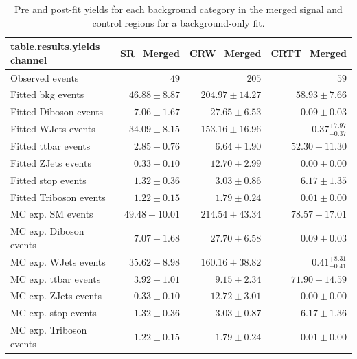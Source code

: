 \begin{table}[t]
\centering
\small
\begin{tabular*}{\textwidth}{@{\extracolsep{\fill}}lrrr}
\toprule
\textbf{table.results.yields channel}           & SR\_Merged            & CRW\_Merged            & CRTT\_Merged              \\
\midrule
Observed events          & $49$              & $205$              & $59$                    \\
\midrule
Fitted bkg events         & $46.88 \pm 8.87$          & $204.97 \pm 14.27$          & $58.93 \pm 7.66$              \\
\midrule
        Fitted Diboson events         & $7.06 \pm 1.67$          & $27.65 \pm 6.53$          & $0.09 \pm 0.03$              \\
        Fitted WJets events         & $34.09 \pm 8.15$          & $153.16 \pm 16.96$          & $0.37_{-0.37}^{+7.97}$              \\
        Fitted ttbar events         & $2.85 \pm 0.76$          & $6.64 \pm 1.90$          & $52.30 \pm 11.30$              \\
        Fitted ZJets events         & $0.33 \pm 0.10$          & $12.70 \pm 2.99$          & $0.00 \pm 0.00$              \\
        Fitted stop events         & $1.32 \pm 0.36$          & $3.03 \pm 0.86$          & $6.17 \pm 1.35$              \\
        Fitted Triboson events         & $1.22 \pm 0.15$          & $1.79 \pm 0.24$          & $0.01 \pm 0.00$              \\
 \midrule
MC exp. SM events              & $49.48 \pm 10.01$          & $214.54 \pm 43.34$          & $78.57 \pm 17.01$              \\
\midrule
        MC exp. Diboson events         & $7.07 \pm 1.68$          & $27.70 \pm 6.58$          & $0.09 \pm 0.03$              \\
        MC exp. WJets events         & $35.62 \pm 8.98$          & $160.16 \pm 38.82$          & $0.41_{-0.41}^{+8.31}$              \\
        MC exp. ttbar events         & $3.92 \pm 1.01$          & $9.15 \pm 2.34$          & $71.90 \pm 14.59$              \\
        MC exp. ZJets events         & $0.33 \pm 0.10$          & $12.72 \pm 3.01$          & $0.00 \pm 0.00$              \\
        MC exp. stop events         & $1.32 \pm 0.36$          & $3.03 \pm 0.87$          & $6.17 \pm 1.36$              \\
        MC exp. Triboson events         & $1.22 \pm 0.15$          & $1.79 \pm 0.24$          & $0.01 \pm 0.00$              \\
\bottomrule
\end{tabular*}
\caption{Pre and post-fit yields for each background category in the merged signal and control regions for a background-only fit.}
\label{tab:yields_mgd}
\end{table}

